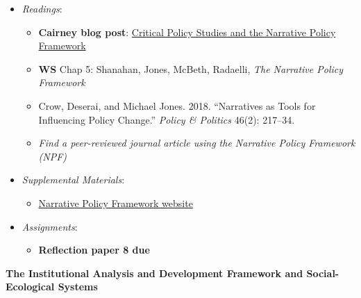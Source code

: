 \begin{itemize}

\item
  \emph{Readings}:

  \begin{itemize}
  
  \item
    \textbf{Cairney blog post}:
    \href{https://paulcairney.wordpress.com/2015/03/06/policy-concepts-in-1000-words-critical-policy-studies-and-the-narrative-policy-framework/}{Critical
    Policy Studies and the Narrative Policy Framework}
  \item
    \textbf{WS} Chap 5: Shanahan, Jones, McBeth, Radaelli, \emph{The
    Narrative Policy Framework}
  \item
    Crow, Deserai, and Michael Jones. 2018. ``Narratives as Tools for
    Influencing Policy Change.'' \emph{Policy \& Politics} 46(2):
    217--34.
  \item
    \emph{Find a peer-reviewed journal article using the Narrative
    Policy Framework (NPF)}
  \end{itemize}
\item
  \emph{Supplemental Materials}:

  \begin{itemize}
  
  \item
    \href{https://www.narrativepolicyframework.org/}{Narrative Policy
    Framework website}
  \end{itemize}
\item
  \emph{Assignments}:

  \begin{itemize}
  
  \item
    \textbf{‌Reflection paper 8 due}
  \end{itemize}
\end{itemize}

\week \textbf{The Institutional Analysis and Development Framework and Social-Ecological Systems}

